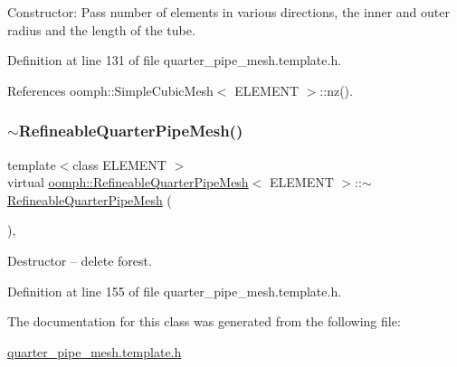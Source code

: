 Constructor\+: Pass number of elements in various directions, the inner and outer radius and the length of the tube. 



Definition at line 131 of file quarter\+\_\+pipe\+\_\+mesh.\+template.\+h.



References oomph\+::\+Simple\+Cubic\+Mesh$<$ E\+L\+E\+M\+E\+N\+T $>$\+::nz().

\mbox{\label{classoomph_1_1RefineableQuarterPipeMesh_ad2015da2ae7382f3fe2c3a088f4fa021}} 
\subsubsection{\texorpdfstring{$\sim$\+Refineable\+Quarter\+Pipe\+Mesh()}{~RefineableQuarterPipeMesh()}}
{\footnotesize\ttfamily template$<$class E\+L\+E\+M\+E\+NT $>$ \\
virtual \hyperlink{classoomph_1_1RefineableQuarterPipeMesh}{oomph\+::\+Refineable\+Quarter\+Pipe\+Mesh}$<$ E\+L\+E\+M\+E\+NT $>$\+::$\sim$\hyperlink{classoomph_1_1RefineableQuarterPipeMesh}{Refineable\+Quarter\+Pipe\+Mesh} (\begin{DoxyParamCaption}{ }\end{DoxyParamCaption})\hspace{0.3cm}{\ttfamily [inline]}, {\ttfamily [virtual]}}



Destructor -- delete forest. 



Definition at line 155 of file quarter\+\_\+pipe\+\_\+mesh.\+template.\+h.



The documentation for this class was generated from the following file\+:\begin{DoxyCompactItemize}
\item 
\hyperlink{quarter__pipe__mesh_8template_8h}{quarter\+\_\+pipe\+\_\+mesh.\+template.\+h}\end{DoxyCompactItemize}
